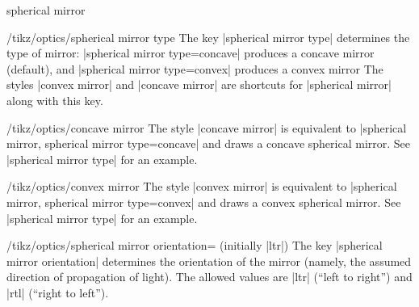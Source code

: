 \documentclass[a4paper]{ltxdoc}
\begin{document}
\begin{shape}{spherical mirror}
\begin{key}{/tikz/optics/spherical mirror type}
    The key |spherical mirror type| determines the type of mirror: |spherical mirror type=concave| produces a concave mirror (default), and |spherical mirror type=convex| produces a convex mirror
    The styles |convex mirror| and |concave mirror| are shortcuts for |spherical mirror| along with this key.

\begin{codeexample}[width=5cm]
\end{codeexample}
\end{key}

\begin{stylekey}{/tikz/optics/concave mirror}
    The style |concave mirror| is equivalent to |spherical mirror, spherical mirror type=concave| and draws a concave spherical mirror. 
    See |spherical mirror type| for an example.
\end{stylekey}

\begin{stylekey}{/tikz/optics/convex mirror}
    The style |convex mirror| is equivalent to |spherical mirror, spherical mirror type=convex| and draws a convex spherical mirror.
    See |spherical mirror type| for an example.
\end{stylekey}


\begin{key}{/tikz/optics/spherical mirror orientation= (initially |ltr|)}
    The key |spherical mirror orientation| determines the orientation of the mirror (namely, the assumed direction of propagation of light).
    The allowed values are |ltr| (\enquote{left to right}) and |rtl| (\enquote{right to left}).

\begin{codeexample}[width=5cm]
\end{codeexample}
\end{key}


\end{shape}
\end{document}

